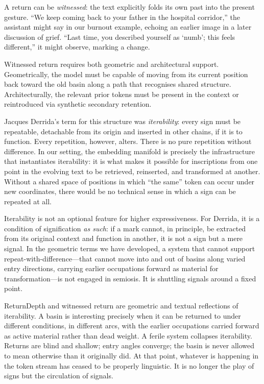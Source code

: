 A return can be \emph{witnessed}: the text explicitly folds its own past into the present gesture. ``We keep coming back to your father in the hospital corridor,'' the assistant might say in our burnout example, echoing an earlier image in a later discussion of grief. ``Last time, you described yourself as `numb'; this feels different,'' it might observe, marking a change.

Witnessed return requires both geometric and architectural support. Geometrically, the model must be capable of moving from its current position back toward the old basin along a path that recognises shared structure. Architecturally, the relevant prior tokens must be present in the context or reintroduced via synthetic secondary retention.

Jacques Derrida's term for this structure was \emph{iterability}: every sign must be repeatable, detachable from its origin and inserted in other chains, if it is to function.\cite{derrida1982} Every repetition, however, alters. There is no pure repetition without difference. In our setting, the embedding manifold is precisely the infrastructure that instantiates iterability: it is what makes it possible for inscriptions from one point in the evolving text to be retrieved, reinserted, and transformed at another. Without a shared space of positions in which ``the same'' token can occur under new coordinates, there would be no technical sense in which a sign can be repeated at all.

Iterability is not an optional feature for higher expressiveness. For Derrida, it is a condition of signification \emph{as such}: if a mark cannot, in principle, be extracted from its original context and function in another, it is not a sign but a mere signal. In the geometric terms we have developed, a system that cannot support repeat-with-difference---that cannot move into and out of basins along varied entry directions, carrying earlier occupations forward as material for transformation---is not engaged in semiosis. It is shuttling signals around a fixed point.

ReturnDepth and witnessed return are geometric and textual reflections of iterability. A basin is interesting precisely when it can be returned to under different conditions, in different arcs, with the earlier occupations carried forward as active material rather than dead weight. A ferile system collapses iterability. Returns are blind and shallow; entry angles converge; the basin is never allowed to mean otherwise than it originally did. At that point, whatever is happening in the token stream has ceased to be properly linguistic. It is no longer the play of signs but the circulation of signals.

